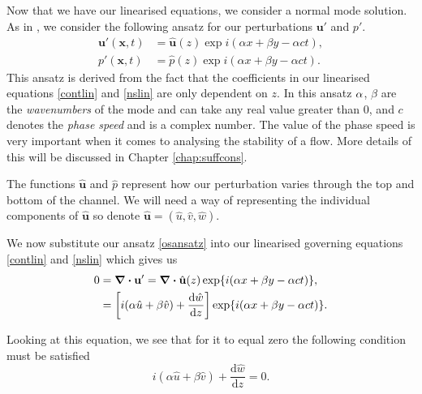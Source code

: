 Now that we have our linearised equations, we consider a normal mode solution. As in \citet{drazin2004hydrodynamic}, we consider the following ansatz for our perturbations $ \mathbf{u}' $ and $ p'$.
\begin{align}
    \mathbf{u}' ( \mathbf{x}, t) &= \hat{\mathbf{u}}(z) \exp{i(\alpha x + \beta y - \alpha c t)}, \nonumber\\
    p'(\mathbf{x}, t) &= \hat{p}(z) \exp{i(\alpha x + \beta y - \alpha c t)}.
\label{osansatz}
\end{align}
This ansatz is derived from the fact that the coefficients in our linearised equations \eqref{contlin} and \eqref{nslin} are only dependent on $ z $. In this ansatz $ \alpha$, $ \beta$ are the \emph{wavenumbers} of the mode and can take any real value greater than $0 $, and $ c $ denotes the \emph{phase speed} and is a complex number. The value of the phase speed is very important when it comes to analysing the stability of a flow. More details of this will be discussed in Chapter \ref{chap:suffcons}.

The functions $ \hat{\mathbf{u}}$ and $ \hat{p} $ represent how our perturbation varies through the top and bottom of the channel. We will need a way of representing the individual components of $ \hat{\mathbf{u}}$ so denote $ \hat{\mathbf{u}} = ( \hat{u}, \hat{v}, \hat{w} ) $.

We now substitute our ansatz \eqref{osansatz} into our linearised governing equations \eqref{contlin} and \eqref{nslin} which gives us
\begin{align}
    0 &= \div \mathbf{u}' = \div \hat{\mathbf{u}}(z) \exp{i(\alpha x + \beta y - \alpha c t)}, \nonumber\\
    &= \left[i(\alpha \hat{u} + \beta \hat{v}) + \frac{\text{d}\hat{w}}{\text{d}z}\right]\exp{i(\alpha x + \beta y - \alpha c t)}.
\end{align}

Looking at this equation, we see that for it to equal zero the following condition must be satisfied 
\begin{equation}
    i(\alpha \hat{u} + \beta \hat{v}) + \frac{\text{d}\hat{w}}{\text{d}z} = 0.
\label{os1}
\end{equation}

